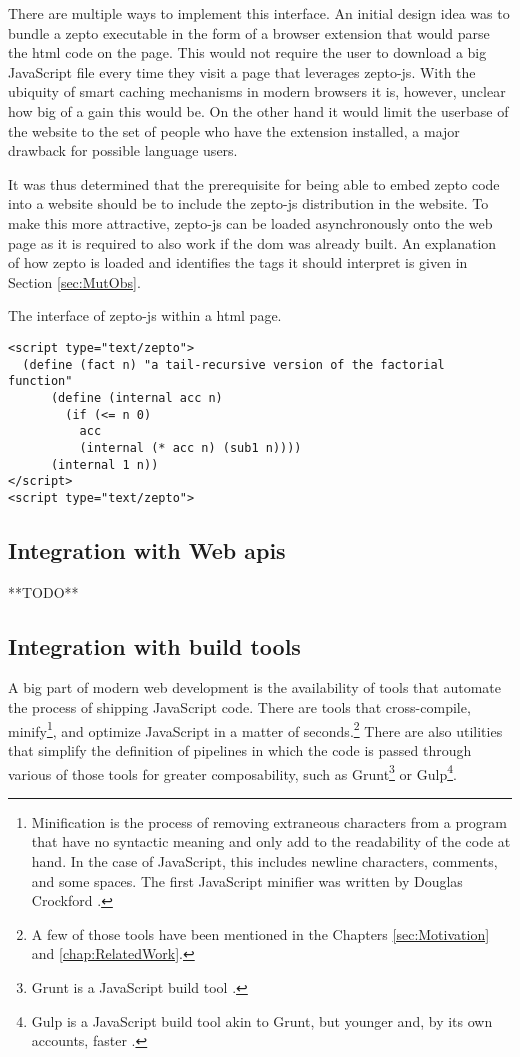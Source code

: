 \documentclass[oneside,11pt,xetex]{scrbook}
\begin{document}
There are multiple ways to implement this interface. An initial design idea was to
bundle a zepto executable in the form of a browser extension that would parse the
\gls{html} code on the page. This would not require the user to download a big JavaScript
file every time they visit a page that leverages zepto-js. With the ubiquity of
smart caching mechanisms in modern browsers it is, however, unclear how big of
a gain this would be. On the other hand it would limit the userbase of the website
to the set of people who have the extension installed, a major drawback for possible
language users.

It was thus determined that the prerequisite for being able to embed zepto code into
a website should be to include the zepto-js distribution in the website. To make
this more attractive, zepto-js can be loaded asynchronously onto the web page as it
is required to also work if the \gls{dom} was already built. An explanation of how
zepto is loaded and identifies the tags it should interpret is given in Section \ref{sec:MutObs}.

\begin{listing}[H]
\caption{The interface of zepto-js within a \gls{html} page.}
\begin{verbatim}
<script type="text/zepto">
  (define (fact n) "a tail-recursive version of the factorial function"
      (define (internal acc n)
        (if (<= n 0)
          acc
          (internal (* acc n) (sub1 n))))
      (internal 1 n))
</script>
<script type="text/zepto">
\end{verbatim}
\label{fig:zpjs}
\end{listing}

\subsection{Integration with Web \glspl{api}}

**TODO**

\subsection{Integration with build tools}
\label{sec:IntegrationTooling}

A big part of modern web development is the availability of tools that automate
the process of shipping JavaScript code. There are tools that cross-compile,
minify\footnote{Minification is the process of removing extraneous characters from
a program that have no syntactic meaning and only add to the readability of the
code at hand. In the case of JavaScript, this includes newline characters, comments,
and some spaces. The first JavaScript minifier was written by Douglas Crockford \parencite{JSMIN}.},
and optimize JavaScript in a matter of seconds.\footnote{A few of those tools have been
mentioned in the Chapters \ref{sec:Motivation} and \ref{chap:RelatedWork}.} There are
also utilities that simplify the definition of pipelines in which the code is passed
through various of those tools for greater composability, such as Grunt\footnote{Grunt
is a JavaScript build tool \parencite{GRUNT}.} or Gulp\footnote{Gulp is a JavaScript build
tool akin to Grunt, but younger and, by its own accounts, faster \parencite{GULP}.}.
\end{document}
